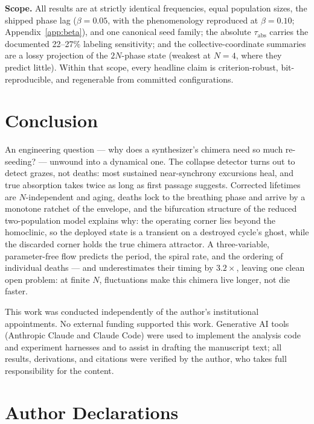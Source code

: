 \documentclass[aip,preprint,amsmath,amssymb]{revtex4-2}
\begin{document}
\textbf{Scope.} All results are at strictly identical frequencies, equal population
sizes, the shipped phase lag ($\beta = 0.05$, with the phenomenology reproduced at
$\beta = 0.10$; Appendix~\ref{app:beta}), and one canonical seed family; the absolute
$\tau_{\mathrm{abs}}$ carries the documented 22--27\% labeling sensitivity; and the
collective-coordinate summaries are a lossy projection of the $2N$-phase state
(weakest at $N = 4$, where they predict little). Within that scope, every headline
claim is criterion-robust, bit-reproducible, and regenerable from committed
configurations.

\section{Conclusion}\label{sec:conclusion}

An engineering question --- why does a synthesizer's chimera need so much
re-seeding? --- unwound into a dynamical one. The collapse detector turns out to
detect grazes, not deaths: most sustained near-synchrony excursions heal, and true
absorption takes twice as long as first passage suggests. Corrected lifetimes are
$N$-independent and aging, deaths lock to the breathing phase and arrive by a
monotone ratchet of the envelope, and the bifurcation structure of the reduced
two-population model explains why: the operating corner lies beyond the homoclinic,
so the deployed state is a transient on a destroyed cycle's ghost, while the
discarded corner holds the true chimera attractor. A three-variable, parameter-free
flow predicts the period, the spiral rate, and the ordering of individual deaths
--- and underestimates their timing by $3.2\times$, leaving one clean open problem:
at finite $N$, fluctuations make this chimera live longer, not die faster.

\begin{acknowledgments}
This work was conducted independently of the author's institutional appointments.
No external funding supported this work. Generative AI tools (Anthropic Claude and
Claude Code) were used to implement the analysis code and experiment harnesses and
to assist in drafting the manuscript text; all results, derivations, and citations
were verified by the author, who takes full responsibility for the content.
\end{acknowledgments}

\section*{Author Declarations}
\end{document}

